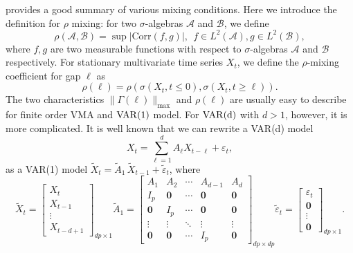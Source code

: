 \cite{bradley2005basic} provides a good summary of various mixing conditions. Here we introduce the definition for $\rho$ mixing: for two $\sigma$-algebras $\mathcal{A}$ and $\mathcal{B}$,  we define 
\begin{equation}
\rho(\mathcal{A}, \mathcal{B}) = \sup  |\text{Corr}(f,g)|,~~ f\in L^2(\mathcal{A}), g\in L^2(\mathcal{B}), \nonumber
\end{equation}
where $f,g$ are two measurable functions with respect to $\sigma$-algebras $\mathcal{A}$ and $\mathcal{B}$ respectively. For stationary multivariate time series $X_t$, we define the $\rho$-mixing coefficient for gap $\ell$ as 
\begin{equation}
\label{eq:ts_rho_mixing}
\rho(\ell) = \rho(\sigma(X_t, t\le 0), \sigma(X_t, t\ge \ell)).
\end{equation}
The two characteristics $\|\Gamma(\ell)\|_{\max}$ and $\rho(\ell)$ are usually easy to describe for finite order VMA and  $\rm{VAR}(1)$ model. For $\rm{VAR}(d)$ with $d > 1$, however, it is more complicated. It is well known that we can rewrite a VAR(d)  model  
\begin{equation}
X_t = \sum_{\ell=1}^d A_{\ell} X_{t-\ell}+\varepsilon_t, \nonumber
\end{equation}
as a VAR(1) model $\tilde{X}_t = \tilde{A}_1 \, \tilde{X}_{t-1} + \tilde{\varepsilon}_t$, where 
\begin{equation}\label{eqn:var_dto1}
\tilde{X}_t = \left[ \begin{array}{c} X_t \\ X_{t-1} \\ \vdots \\ X_{t-d+1} \end{array} \right]_{dp \times 1}
\tilde{A}_1 = \left[ \begin{array}{ccccc} A_1 & A_2 & \cdots & A_{d-1} & A_d \\ 
										I_p & \mathbf{0} & \cdots & \mathbf{0} & \mathbf{0} \\
										\mathbf{0} & I_p & \cdots & \mathbf{0} & \mathbf{0} \\
										\vdots & \vdots & \ddots & \vdots & \vdots \\
										\mathbf{0} & \mathbf{0} & \cdots & I_p & \mathbf{0} \end{array}\right]_{dp \times dp}
\tilde{\varepsilon}_t = \left[ \begin{array}{c} \varepsilon_t \\ \mathbf{0} \\ \vdots \\ \mathbf{0} \end{array} \right]_{dp \times 1}. \nonumber
\end{equation} 
